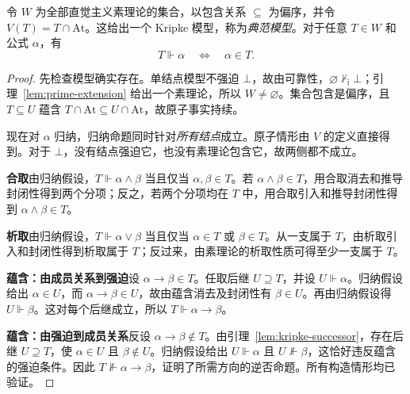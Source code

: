 \documentclass[lang=cn,a4paper,fontset=none,zihao=false,10pt,openany,twoside]{beautybook}
\numberwithin{algorithm}{chapter}
\newcommand{\At}{\mathrm{At}}
\begin{document}
\begin{readingmaterial}[title={阅读材料：Kripke 语义},title after break={阅读材料：Kripke 语义（续）}]
\begin{lemma}[典范模型与真值引理]\label{lem:kripke-truth}
令 $W$ 为全部直觉主义素理论的集合，以包含关系 $\subseteq$ 为偏序，并令 $V(T)=T\cap\At$。这给出一个 Kripke 模型，称为\emph{典范模型}。对于任意 $T\in W$ 和公式 $\alpha$，有
\[
 T\Vdash\alpha\quad\Longleftrightarrow\quad\alpha\in T.
\]
\end{lemma}
\begin{proof}
先检查模型确实存在。单结点模型不强迫 $\bot$，故由可靠性，$\varnothing\nvdash_{\mathrm i}\bot$；引理~\ref{lem:prime-extension} 给出一个素理论，所以 $W\ne\varnothing$。集合包含是偏序，且 $T\subseteq U$ 蕴含 $T\cap\At\subseteq U\cap\At$，故原子事实持续。

现在对 $\alpha$ 归纳，归纳命题同时针对\emph{所有结点}成立。原子情形由 $V$ 的定义直接得到。对于 $\bot$，没有结点强迫它，也没有素理论包含它，故两侧都不成立。

\par\smallskip\noindent\textbf{合取}\quad 由归纳假设，$T\Vdash\alpha\wedge\beta$ 当且仅当 $\alpha,\beta\in T$。若 $\alpha\wedge\beta\in T$，用合取消去和推导封闭性得到两个分项；反之，若两个分项均在 $T$ 中，用合取引入和推导封闭性得到 $\alpha\wedge\beta\in T$。

\par\smallskip\noindent\textbf{析取}\quad 由归纳假设，$T\Vdash\alpha\vee\beta$ 当且仅当 $\alpha\in T$ 或 $\beta\in T$。从一支属于 $T$，由析取引入和封闭性得到析取属于 $T$；反过来，由素理论的析取性质可得至少一支属于 $T$。

\par\smallskip\noindent\textbf{蕴含：由成员关系到强迫}\quad 设 $\alpha\to\beta\in T$。任取后继 $U\supseteq T$，并设 $U\Vdash\alpha$。归纳假设给出 $\alpha\in U$，而 $\alpha\to\beta\in U$，故由蕴含消去及封闭性有 $\beta\in U$。再由归纳假设得 $U\Vdash\beta$。这对每个后继成立，所以 $T\Vdash\alpha\to\beta$。

\par\smallskip\noindent\textbf{蕴含：由强迫到成员关系}\quad 反设 $\alpha\to\beta\notin T$。由引理~\ref{lem:kripke-successor}，存在后继 $U\supseteq T$，使 $\alpha\in U$ 且 $\beta\notin U$。归纳假设给出 $U\Vdash\alpha$ 且 $U\nVdash\beta$，这恰好违反蕴含的强迫条件。因此 $T\nVdash\alpha\to\beta$，证明了所需方向的逆否命题。所有构造情形均已验证。
\end{proof}


\end{readingmaterial}
\end{document}
